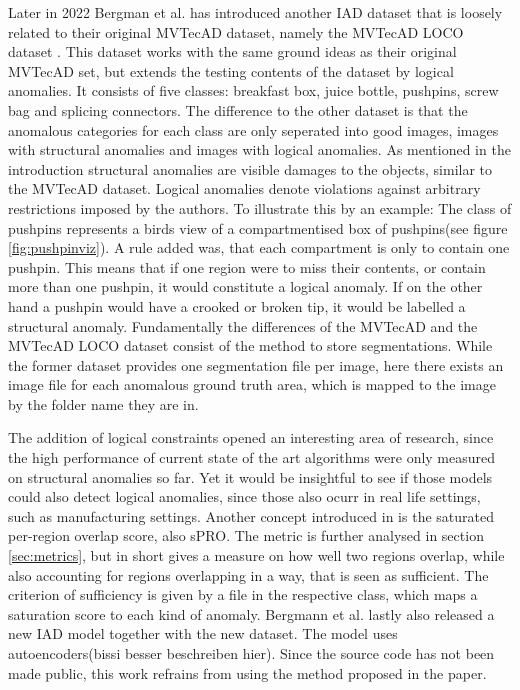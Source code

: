 

Later in 2022 Bergman et al. has introduced another IAD dataset that is loosely related to their original MVTecAD dataset, namely the MVTecAD LOCO dataset \cite{LOCODentsAndScratchesBergmann2022}. 
This dataset works with the same ground ideas as their original MVTecAD set, but extends the testing contents of the dataset by logical anomalies. 
It consists of five classes: breakfast box, juice bottle, pushpins, screw bag and splicing connectors. The difference to the other dataset is that the anomalous categories for each class are only seperated into good images, images with structural anomalies 
and images with logical anomalies. As mentioned in the introduction structural anomalies are visible damages to the objects, similar to the MVTecAD dataset. Logical anomalies denote violations against arbitrary restrictions 
imposed by the authors. To illustrate this by an example: The class of pushpins represents a birds view of a compartmentised box of pushpins(see figure \ref{fig:pushpinviz}). A rule added was, 
that each compartment is only to contain one pushpin. This means that if one region were to miss their contents, or contain more than one pushpin, it would constitute a logical anomaly. If on the 
other hand a pushpin would have a crooked or broken tip, it would be  labelled a structural anomaly. Fundamentally the differences of the 
MVTecAD and the MVTecAD LOCO dataset consist of the method to store segmentations. While the former dataset provides one segmentation file per image, here there exists an image 
file for each anomalous ground truth area, which is mapped to the image by the folder name they are in.




The addition of logical constraints opened an interesting area of research, since the high performance 
of current state of the art algorithms were only measured on structural anomalies so far. Yet it would be insightful to see if those models could also detect logical anomalies, since those also ocurr 
in real life settings, such as manufacturing settings. Another concept introduced in \cite{LOCODentsAndScratchesBergmann2022} is the 
saturated per-region overlap score, also sPRO. The metric is further analysed in section \ref{sec:metrics}, but in short gives a measure 
on how well two regions overlap, while also accounting for regions overlapping in a way, that is seen as sufficient. The criterion of 
sufficiency is given by a file in the respective class, which maps a saturation score to each kind of anomaly.
Bergmann et al.\cite{LOCODentsAndScratchesBergmann2022} lastly also released a new IAD model together with the new dataset. The model uses autoencoders(bissi besser beschreiben hier). Since the source code has not been made public, 
this work refrains from using the method proposed in the paper.


